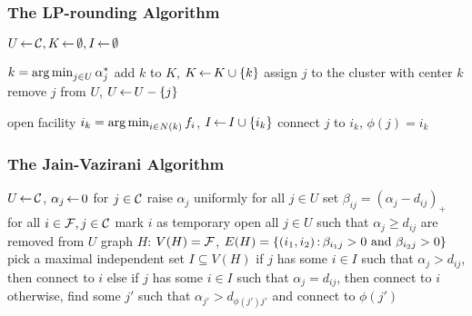 \documentclass[handout, hyperref, xcolor=dvipsnames]{beamer}
\begin{document}
\begin{frame}
  \frametitle{The LP-rounding Algorithm}
    \begin{algorithm}[H]
      \begin{algorithmic}[1]
        \State $U {\,\leftarrow\,} {\cal C}, K {\,\leftarrow\,} \emptyset, I {\,\leftarrow\,} \emptyset$

        \State $k = \operatorname*{arg\,min}_{j\in U} \alpha_j^\ast$
        \State add $k$ to $K$, $K {\,\leftarrow\,} K \cup \{k\}$
        \State assign $j$ to the cluster with center $k$
        \State remove $j$ from $U$, $U {\,\leftarrow\,} U - \{j\}$
        \EndFor
        \EndWhile
        

         
        \State open facility $i_k = \operatorname*{arg\,min}_{i\in N(k)} f_i$, $I{\,\leftarrow\,} I \cup \{i_k\}$
        \State connect $j$ to $i_k$, $\phi(j) = i_k$
        \EndFor
        \EndFor
      \end{algorithmic}
    \end{algorithm}
\end{frame}

\begin{frame}
  \frametitle{The Jain-Vazirani Algorithm}
  \begin{algorithm}[H]
    \begin{algorithmic}[1]
      \State $U {\,\leftarrow\,} {\cal C}$, $\alpha_j {\,\leftarrow\,} 0$ for $j\in {\cal C}$
      \State raise $\alpha_j$ uniformly for all $j\in U$
      \State set $\beta_{ij} = (\alpha_j - d_{ij})_+$ for all $i\in {\cal F}, j \in {\cal C}$
      \State mark $i$ as temporary open
      \State all $j\in U$ such that $\alpha_j \geq d_{ij}$ are removed from $U$
      \EndIf
      \EndWhile
      \State graph $H$: $V(H)={\cal F}$, $E(H) = \{(i_1,i_2) {\,:\,} \beta_{i_1 j} > 0 \text{ and } \beta_{i_2 j} > 0\}$
      \State pick a maximal independent set $I\subseteq V(H)$
      \State if $j$ has some $i\in I$ such that $\alpha_j > d_{ij}$, then connect to $i$
      \State else if {$j$ has some $i\in I$ such that $\alpha_j = d_{ij}$}, then connect to $i$
      \State otherwise, find some $j'$ such that $\alpha_{j'} > d_{\phi(j')j'}$ and connect to $\phi(j')$
      \EndFor
    \end{algorithmic}
  \end{algorithm}
\end{frame}
\end{document}
